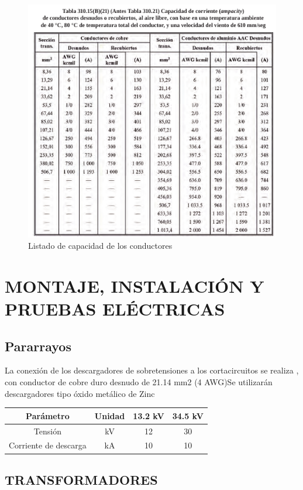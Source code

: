 \documentclass[a5paper]{book}%
\begin{document}
\begin{figure}[H]
  \centering
  \caption{Listado de capacidad de los conductores}
  \label{fig:capacidaddeconductores}
  \includegraphics[width=\linewidth]{capacidad_cables_ntc_2050}
\end{figure}

\chapter{MONTAJE, INSTALACIÓN Y PRUEBAS ELÉCTRICAS}

\section{Pararrayos}

La conexión de los descargadores de sobretensiones a los
cortacircuitos se realiza , con conductor de cobre duro desnudo de
21.14 mm2 (4 AWG)Se utilizarán descargadores tipo óxido metálico de
Zinc

\begin{tabular}{|c|c|c|c|}
  \hline
  Parámetro& Unidad& 13.2 kV& 34.5 kV\\\hline
  Tensión& kV& 12& 30\\\hline
  Corriente de descarga&kA&10&10\\\hline
\end{tabular}

\section{TRANSFORMADORES}
\end{document}

